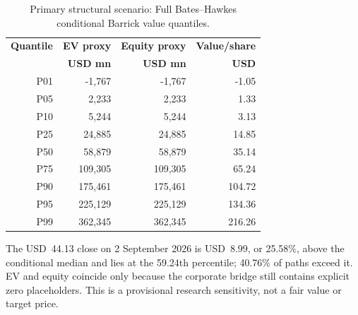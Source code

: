 \begin{table}[H]
\centering
\caption{Primary structural scenario: Full Bates--Hawkes conditional Barrick value quantiles.}
\label{tab:primary-bates-hawkes-valuation-quantiles}
\small
\setlength{\tabcolsep}{6pt}
\renewcommand{\arraystretch}{1.08}
\begin{tabular}{rrrr}
\toprule
\textbf{Quantile} & \textbf{EV proxy} & \textbf{Equity proxy} & \textbf{Value/share} \\
& \textbf{USD mn} & \textbf{USD mn} & \textbf{USD} \\
\midrule
P01 & -1,767 & -1,767 & -1.05 \\
P05 & 2,233 & 2,233 & 1.33 \\
P10 & 5,244 & 5,244 & 3.13 \\
P25 & 24,885 & 24,885 & 14.85 \\
P50 & 58,879 & 58,879 & 35.14 \\
P75 & 109,305 & 109,305 & 65.24 \\
P90 & 175,461 & 175,461 & 104.72 \\
P95 & 225,129 & 225,129 & 134.36 \\
P99 & 362,345 & 362,345 & 216.26 \\
\bottomrule
\end{tabular}

\par\smallskip
\footnotesize The USD~44.13 close on 2 September 2026 is USD~8.99, or 25.58\%,
above the conditional median and lies at the 59.24th percentile; 40.76\% of
paths exceed it. EV and equity coincide only because the corporate bridge
still contains explicit zero placeholders. This is a provisional research
sensitivity, not a fair value or target price.
\end{table}


